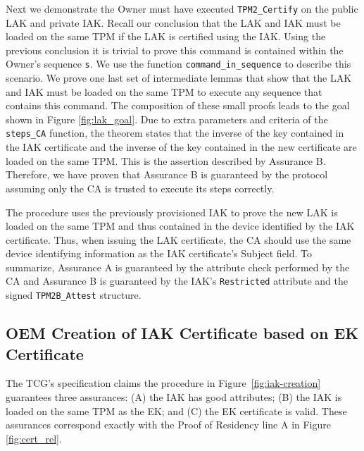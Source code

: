 \documentclass[runningheads]{llncs}
\begin{document}
Next we demonstrate the Owner must have executed \verb|TPM2_Certify|
on the public LAK and private IAK.  Recall our conclusion that the LAK
and IAK must be loaded on the same TPM if the LAK is certified using
the IAK. Using the previous conclusion it is trivial to prove this
command is contained within the Owner's sequence \verb|s|.  We use the
function \verb|command_in_sequence| to describe this scenario.  We
prove one last set of intermediate lemmas that show that the LAK and
IAK must be loaded on the same TPM to execute any sequence that
contains this command.  The composition of these small proofs leads to
the goal shown in Figure \ref{fig:lak_goal}. Due to extra parameters
and criteria of the \verb|steps_CA| function, the theorem states that
the inverse of the key contained in the IAK certificate and the
inverse of the key contained in the new certificate are loaded on the
same TPM.  This is the assertion described by Assurance B.  Therefore,
we have proven that Assurance B is guaranteed by the protocol assuming
only the CA is trusted to execute its steps correctly.

The procedure uses the previously provisioned IAK to prove the new LAK
is loaded on the same TPM and thus contained in the device identified
by the IAK certificate. Thus, when issuing the LAK certificate, the CA
should use the same device identifying information as the IAK
certificate's Subject field. To summarize, Assurance A is guaranteed
by the attribute check performed by the CA and Assurance B is
guaranteed by the IAK's \verb|Restricted| attribute and the signed
\verb|TPM2B_Attest| structure.

\subsection{OEM Creation of IAK Certificate based on EK Certificate}

The TCG's specification claims the procedure in
Figure~\ref{fig:iak-creation} guarantees three assurances: (A) the IAK
has good attributes; (B) the IAK is loaded on the same TPM as the EK;
and (C) the EK certificate is valid. These assurances correspond
exactly with the Proof of Residency line A in Figure
\ref{fig:cert_rel}.
\end{document}
